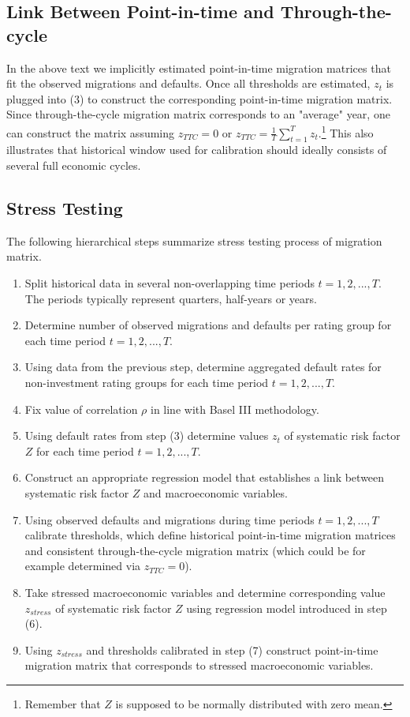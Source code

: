 \documentclass[a4paper]{article}
\begin{document}
\subsection{Link Between Point-in-time and Through-the-cycle}

In the above text we implicitly estimated point-in-time migration 
matrices that fit the observed migrations and defaults. Once all thresholds are 
estimated, $z_t$ is plugged into (3) to construct the corresponding 
point-in-time migration matrix. Since through-the-cycle migration 
matrix corresponds to an "average" year, one can construct the 
matrix assuming $z_{TTC} = 0$ or $z_{TTC} = \frac{1}{T}\sum_{t = 1}^T 
z_t$.\footnote{Remember that $Z$ is supposed to 
be normally distributed with zero mean.} This also illustrates that historical window used 
for calibration should ideally consists of several full economic cycles.

\subsection{Stress Testing}

The following hierarchical steps summarize stress testing process of migration matrix.
\begin{enumerate}
\item Split historical data in several non-overlapping time periods $t = 1, 2, ..., T$. 
The periods typically represent quarters, half-years or years.
\item Determine number of observed migrations and defaults per rating group for each time period $t = 1, 2, ..., T$.
\item Using data from the previous step, determine aggregated default rates 
for non-investment rating groups for each time period $t = 1, 2, ..., T$.
\item Fix value of correlation $\rho$ in line with Basel III methodology.
\item Using default rates from step (3) determine values $z_t$ 
of systematic risk factor $Z$ for each time period $t = 1, 2, ..., T$.
\item Construct an appropriate regression model that establishes a 
link between systematic risk factor $Z$ and macroeconomic variables.
\item Using observed defaults and migrations during time periods $t = 1, 2, ..., T$ calibrate thresholds, which define historical point-in-time 
migration matrices and consistent through-the-cycle migration matrix (which could be for example determined via $z_{TTC} = 0$).
\item Take stressed macroeconomic variables and determine corresponding 
value $z_{stress}$ of systematic risk factor $Z$ using regression model 
introduced in step (6).
\item Using $z_{stress}$ and thresholds calibrated in step (7) 
construct point-in-time migration matrix that corresponds to stressed 
macroeconomic variables.
\end{enumerate}
\end{document}
